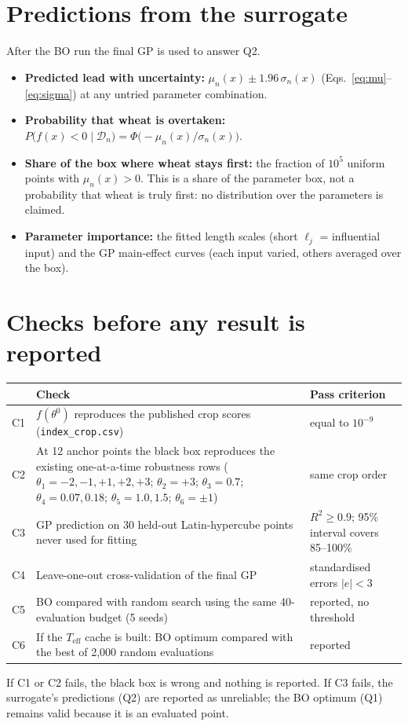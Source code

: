 \documentclass[11pt,a4paper]{article}
\numberwithin{equation}{section}
\newcommand{\Teff}{T_{\text{eff}}}
\begin{document}
\section{Predictions from the surrogate}
After the BO run the final GP is used to answer Q2.
\begin{itemize}
\item \textbf{Predicted lead with uncertainty:} $\mu_n(x)\pm1.96\,\sigma_n(x)$ (Eqs.~\ref{eq:mu}--\ref{eq:sigma})
at any untried parameter combination.
\item \textbf{Probability that wheat is overtaken:} $P\bigl(f(x)<0\mid\mathcal D_n\bigr)=\Phi\bigl(-\mu_n(x)/\sigma_n(x)\bigr)$.
\item \textbf{Share of the box where wheat stays first:} the fraction of $10^5$ uniform points with $\mu_n(x)>0$.
This is a share of the parameter box, not a probability that wheat is truly first: no distribution over
the parameters is claimed.
\item \textbf{Parameter importance:} the fitted length scales (short $\ell_j$ = influential input) and the GP
main-effect curves (each input varied, others averaged over the box).
\end{itemize}

\section{Checks before any result is reported}\label{sec:checks}
\begin{table}[H]\centering\small
\begin{tabularx}{\linewidth}{@{}l Y l@{}}
\toprule
& Check & Pass criterion \\
\midrule
C1 & $f(\theta^0)$ reproduces the published crop scores (\texttt{index\_crop.csv}) & equal to $10^{-9}$ \\
C2 & At 12 anchor points the black box reproduces the existing one-at-a-time robustness rows ($\theta_1=-2,-1,+1,+2,+3$;
     $\theta_2=+3$; $\theta_3=0.7$; $\theta_4=0.07, 0.18$; $\theta_5=1.0,1.5$; $\theta_6=\pm1$) & same crop order \\
C3 & GP prediction on 30 held-out Latin-hypercube points never used for fitting & $R^2\ge0.9$; 95\% interval covers
     85--100\% \\
C4 & Leave-one-out cross-validation of the final GP & standardised errors $|e|<3$ \\
C5 & BO compared with random search using the same 40-evaluation budget (5 seeds) & reported, no threshold \\
C6 & If the $\Teff$ cache is built: BO optimum compared with the best of 2{,}000 random evaluations & reported \\
\bottomrule
\end{tabularx}
\end{table}
\noindent If C1 or C2 fails, the black box is wrong and nothing is reported. If C3 fails, the surrogate's predictions
(Q2) are reported as unreliable; the BO optimum (Q1) remains valid because it is an evaluated point.
\end{document}
